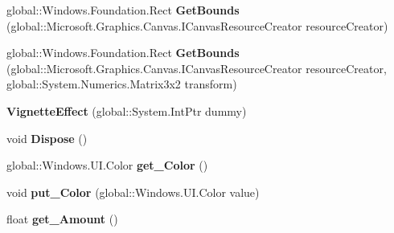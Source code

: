 \begin{DoxyCompactItemize}
\mbox{\label{class_microsoft_1_1_graphics_1_1_canvas_1_1_effects_1_1_vignette_effect_af51b08a59d366ec46f8f8cd729c45b98}} 
global\+::\+Windows.\+Foundation.\+Rect {\bfseries Get\+Bounds} (global\+::\+Microsoft.\+Graphics.\+Canvas.\+I\+Canvas\+Resource\+Creator resource\+Creator)
\item 
\mbox{\label{class_microsoft_1_1_graphics_1_1_canvas_1_1_effects_1_1_vignette_effect_afa665f684b9b46082ac4bc19cf044be3}} 
global\+::\+Windows.\+Foundation.\+Rect {\bfseries Get\+Bounds} (global\+::\+Microsoft.\+Graphics.\+Canvas.\+I\+Canvas\+Resource\+Creator resource\+Creator, global\+::\+System.\+Numerics.\+Matrix3x2 transform)
\item 
\mbox{\label{class_microsoft_1_1_graphics_1_1_canvas_1_1_effects_1_1_vignette_effect_ae769910619bfea37cb3260c684934e3d}} 
{\bfseries Vignette\+Effect} (global\+::\+System.\+Int\+Ptr dummy)
\item 
\mbox{\label{class_microsoft_1_1_graphics_1_1_canvas_1_1_effects_1_1_vignette_effect_a7a8de4daab6ece7ddea70ba91c2d83b2}} 
void {\bfseries Dispose} ()
\item 
\mbox{\label{class_microsoft_1_1_graphics_1_1_canvas_1_1_effects_1_1_vignette_effect_af4d9c28e4c0feac0fb70bb07348ae835}} 
global\+::\+Windows.\+U\+I.\+Color {\bfseries get\+\_\+\+Color} ()
\item 
\mbox{\label{class_microsoft_1_1_graphics_1_1_canvas_1_1_effects_1_1_vignette_effect_a44861e2a372c32e4852e38cb6b584e50}} 
void {\bfseries put\+\_\+\+Color} (global\+::\+Windows.\+U\+I.\+Color value)
\item 
\mbox{\label{class_microsoft_1_1_graphics_1_1_canvas_1_1_effects_1_1_vignette_effect_a0b6144af2f9289627af2135af698b53d}} 
float {\bfseries get\+\_\+\+Amount} ()

\end{DoxyCompactItemize}
